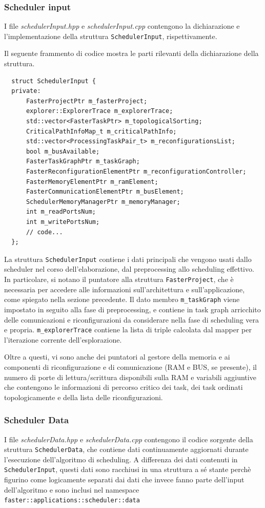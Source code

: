 \subsubsection{Scheduler input}
I file \emph{schedulerInput.hpp} e \emph{schedulerInput.cpp} contengono la 
dichiarazione e l'implementazione della struttura \verb+SchedulerInput+, 
rispettivamente.

Il seguente frammento di codice mostra le parti rilevanti della 
dichiarazione della struttura.
\newline
\begin{verbatim}
  struct SchedulerInput {
  private:
      FasterProjectPtr m_fasterProject;
      explorer::ExplorerTrace m_explorerTrace;
      std::vector<FasterTaskPtr> m_topologicalSorting;
      CriticalPathInfoMap_t m_criticalPathInfo;
      std::vector<ProcessingTaskPair_t> m_reconfigurationsList;
      bool m_busAvailable;
      FasterTaskGraphPtr m_taskGraph;
      FasterReconfigurationElementPtr m_reconfigurationController;
      FasterMemoryElementPtr m_ramElement;
      FasterCommunicationElementPtr m_busElement;
      SchedulerMemoryManagerPtr m_memoryManager;
      int m_readPortsNum;
      int m_writePortsNum;
      // code...
  };
\end{verbatim}
La struttura \verb+SchedulerInput+ contiene i dati principali che vengono usati 
dallo scheduler nel corso dell'elaborazione, dal preprocessing allo scheduling 
effettivo. In particolare, si notano il puntatore alla struttura 
\verb+FasterProject+, che è necessaria per accedere alle informazioni 
sull'architettura e sull'applicazione, come spiegato nella sezione precedente.
Il dato membro \verb+m_taskGraph+ viene impostato in seguito alla fase di 
preprocessing, e contiene in task graph arricchito delle comunicazioni e 
riconfigurazioni da considerare nella fase di scheduling vera e propria. 
\verb+m_explorerTrace+ contiene la lista di triple calcolata dal mapper per 
l'iterazione corrente dell'esplorazione.

Oltre a questi, vi sono anche dei puntatori al gestore della memoria e ai 
componenti di riconfigurazione e di comunicazione (\acs{RAM} e BUS, se 
presente), il numero di porte di lettura/scrittura disponibili sulla \acs{RAM} 
e variabili aggiuntive che contengono le informazioni di percorso critico dei 
task, dei task ordinati topologicamente e della lista delle riconfigurazioni.

\subsubsection{Scheduler Data}
I file \emph{schedulerData.hpp} e \emph{schedulerData.cpp} contengono il codice 
sorgente della struttura \verb+SchedulerData+, che contiene dati continuamente 
aggiornati durante l'esecuzione dell'algoritmo di scheduling. A differenza dei 
dati contenuti in \verb+SchedulerInput+, questi dati sono racchiusi in una 
struttura a sé stante perchè figurino come logicamente separati dai dati che 
invece fanno parte dell'input dell'algoritmo e sono inclusi nel namespace 
\verb+faster::applications::scheduler::data+

